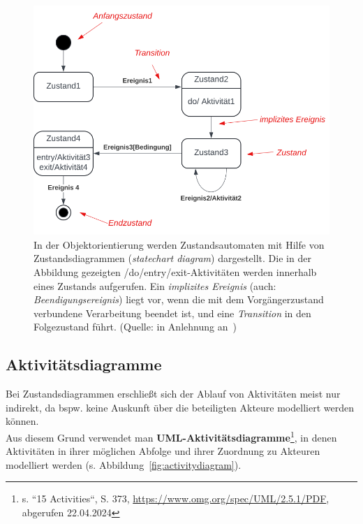 \begin{figure}
    \centering
    \includegraphics[scale=0.4]{part two/Objektorientierte Analyse/img/statediagram}
    \caption{In der Objektorientierung werden Zustandsautomaten mit Hilfe von Zustandsdiagrammen (\textit{statechart diagram}) dargestellt. Die in der Abbildung gezeigten /do/entry/exit-Aktivitäten werden innerhalb eines Zustands aufgerufen. Ein \textit{implizites Ereignis} (auch: \textit{Beendigungsereignis}) liegt vor, wenn die mit dem Vorgängerzustand verbundene Verarbeitung beendet ist, und eine \textit{Transition} in den Folgezustand führt. (Quelle: in Anlehnung an~\cite[90, Abb. 2.11-6]{Bal05})}
    \label{fig:statediagram}
\end{figure}

\subsection*{Aktivitätsdiagramme}
Bei Zustandsdiagrammen erschließt sich der Ablauf von Aktivitäten meist nur indirekt, da bspw. keine Auskunft über die beteiligten Akteure modelliert werden können.\\

\noindent
Aus diesem Grund verwendet man \textbf{UML-Aktivitätsdiagramme}\footnote{
s. ``15 Activities``, S. 373, \url{https://www.omg.org/spec/UML/2.5.1/PDF}, abgerufen 22.04.2024
}, in denen Aktivitäten in ihrer möglichen Abfolge und ihrer Zuordnung zu Akteuren modelliert werden (s. Abbildung~\ref{fig:activitydiagram}).\\


